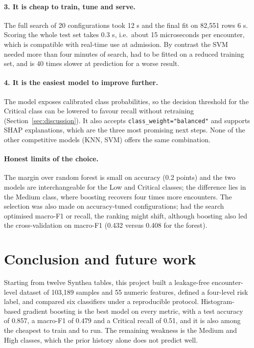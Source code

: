 \documentclass[11pt,a4paper]{article}
\newcommand{\code}[1]{\texttt{\textcolor{codegrey}{#1}}}
\newcommand{\sect}[1]{\section{#1}}
\begin{document}
\paragraph{3. It is cheap to train, tune and serve.}
The full search of 20 configurations took 12 s and the final fit on 82{,}551 rows 6 s. Scoring the
whole test set takes 0.3 s, i.e.\ about 15 microseconds per encounter, which is compatible with
real-time use at admission. By contrast the SVM needed more than four minutes of search, had to be
fitted on a reduced training set, and is 40 times slower at prediction for a worse result.

\paragraph{4. It is the easiest model to improve further.}
The model exposes calibrated class probabilities, so the decision threshold for the Critical class
can be lowered to favour recall without retraining (Section~\ref{sec:discussion}). It also accepts
\code{class\_weight="balanced"} and supports SHAP explanations, which are the three most
promising next steps. None of the other competitive models (KNN, SVM) offers the same combination.

\paragraph{Honest limits of the choice.}
The margin over random forest is small on accuracy (0.2 points) and the two models are
interchangeable for the Low and Critical classes; the difference lies in the Medium class, where
boosting recovers four times more encounters. The selection was also made on accuracy-tuned
configurations; had the search optimised macro-F1 or recall, the ranking might shift, although
boosting also led the cross-validation on macro-F1 (0.432 versus 0.408 for the forest).

\sect{Conclusion and future work}

Starting from twelve Synthea tables, this project built a leakage-free encounter-level dataset of
103{,}189 samples and 55 numeric features, defined a four-level risk label, and compared six
classifiers under a reproducible protocol. Histogram-based gradient boosting is the best model on
every metric, with a test accuracy of 0.857, a macro-F1 of 0.479 and a Critical recall of 0.51,
and it is also among the cheapest to train and to run. The remaining weakness is the Medium and
High classes, which the prior history alone does not predict well.
\end{document}
